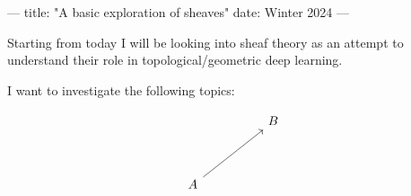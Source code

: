 ---
title: "A basic exploration of sheaves"
date: Winter 2024
---

\usepackage{tikz-cd}

Starting from today I will be looking into sheaf theory as an attempt to understand their role in topological/geometric deep learning.

I want to investigate the following topics:

\[\begin{tikzcd}
	&& B \\
	\\
	A
	\arrow[from=3-1, to=1-3]
\end{tikzcd}\]


